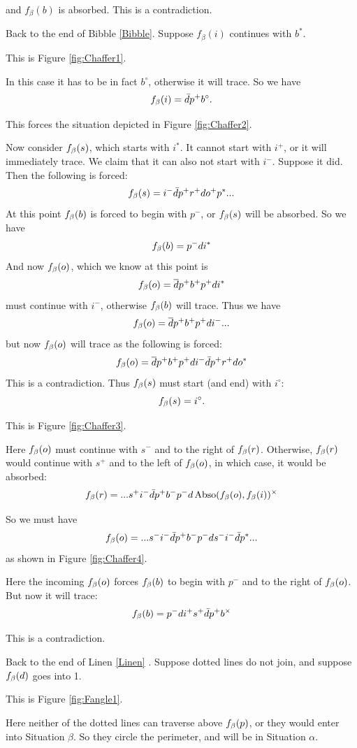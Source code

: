 and $f_\beta(b)$ is absorbed. This is a contradiction.

\label{Chaffer}
Back to the end of Bibble \ref{Bibble}. Suppose $f_\beta(i)$ continues with $b^*$. 

This is Figure \ref{fig:Chaffer1}.

In this case it has to be in fact $b^\circ$, otherwise it will trace. So we have
\[
f_\beta(i) = \bar{d} p^+b^\circ.
\]

This forces the situation depicted in Figure \ref{fig:Chaffer2}.


Now consider $f_\beta(s)$, which starts with $i^*$. It cannot start with $i^+$, or it will immediately trace. We claim that it can also not start with $i^-$. Suppose it did. Then the following is forced:
\[
f_\beta(s) = i^-\bar{d} p^+r^+ d o^+ p^*...
\]
At this point $f_\beta(b)$ is forced to begin with $p^-$, or $f_\beta(s)$ will be absorbed. So we have
\[
f_\beta(b) = p^-di^*
\]
And now $f_\beta(o)$, which we know at this point is
\[
f_\beta(o) = \overline{d}p^+b^+p^+di^*
\]
must continue with $i^-$, otherwise $f_\beta(b)$ will trace. Thus we have
\[
f_\beta(o) = \overline{d}p^+b^+p^+di^-...
\]
but now $f_\beta(o)$ will trace as the following is forced:
\[
f_\beta(o) = \overline{d}p^+b^+p^+di^-\bar{d} p^+r^+do^*
\]
This is a contradiction. Thus $f_\beta(s)$ must start (and end) with $i^\circ$:
\[
f_\beta(s) = i^\circ.
\]

This is Figure \ref{fig:Chaffer3}.

Here $f_\beta(o)$ must continue with $s^-$ and to the right of $f_\beta(r)$. Otherwise, $f_\beta(r)$ would continue with $s^+$ and to the left of $f_\beta(o)$, in which case, it would be absorbed:
\[
f_\beta(r) = ...s^+ i^- \bar{d} p^+ b^- p^- d \operatorname{Abso}(f_\beta(o), f_\beta(i))^\times
\]

So we must have
\[
f_\beta(o) =...s^- i^- \bar{d} p^+ b^- p^- d s^- i^- \bar{d} p^*...
\]
as shown in Figure \ref{fig:Chaffer4}.

Here the incoming $f_\beta(o)$ forces $f_\beta(b)$ to begin with $p^-$ and to the right of $f_\beta(o)$. But now it will trace:
\[
f_\beta(b) = p^- d i^+ s^+ \bar{d} p^+ b^\times
\]

This is a contradiction.

\label{Fangle}
Back to the end of Linen \ref{Linen}
. Suppose dotted lines do not join, and suppose $f_\beta(d)$ goes into 1.

This is Figure \ref{fig:Fangle1}.

Here neither of the dotted lines can traverse above $f_\beta(p)$, or they would enter into Situation $\beta$. So they circle the perimeter, and will be in Situation $\alpha$.

